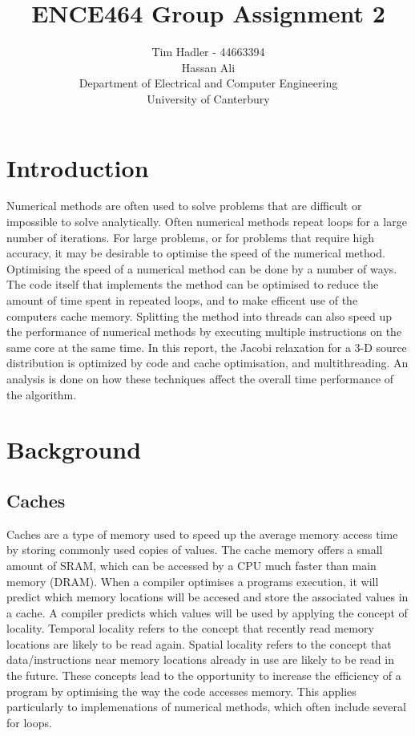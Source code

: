 \documentclass[a4paper, 12pt]{article}
\title{\vspace{-1cm} ENCE464 Group Assignment 2}
\author{Tim Hadler - 44663394 \\ Hassan Ali \\
	\small Department of Electrical and Computer Engineering\\
	\small University of Canterbury}
\begin{document}
\maketitle
\pagebreak
	
\section{Introduction}
	Numerical methods are often used to solve problems that are difficult or impossible to solve analytically. Often numerical methods repeat loops for a large number of iterations. For large problems, or for problems that require high accuracy, it may be desirable to optimise the speed of the numerical method. Optimising the speed of a numerical method can be done by a number of ways. The code itself that implements the method can be optimised to reduce the amount of time spent in repeated loops, and to make efficent use of the computers cache memory. Splitting the method into threads can also speed up the performance of numerical methods by executing multiple instructions on the same core at the same time. In this report, the Jacobi relaxation for a 3-D source distribution is optimized by code and cache optimisation, and multithreading. An analysis is done on how these techniques affect the overall time performance of the algorithm. 
	

\section{Background}

\subsection{Caches}
Caches are a type of memory used to speed up the average memory access time by storing commonly used copies of values. The cache memory offers a small amount of SRAM, which can be accessed by a CPU much faster than main memory (DRAM). When a compiler optimises a programs execution, it will predict which memory locations will be accesed and store the associated values in a cache. A compiler predicts which values will be used by applying the concept of locality. Temporal locality refers to the concept that recently read memory locations are likely to be read again. Spatial locality refers to the concept that data/instructions near memory locations already in use are likely to be read in the future. These concepts lead to the opportunity to increase the efficiency of a program by optimising the way the code accesses memory. This applies particularly to implemenations of numerical methods, which often include several for loops. 
\end{document}
